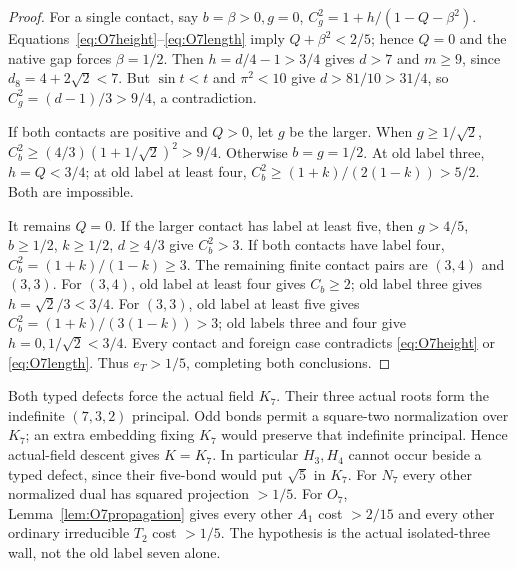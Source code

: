 \documentclass[11pt]{article}
\begin{document}
\begin{proof}
For a single contact, say $b=\beta>0,g=0$,
$C_g^2=1+h/(1-Q-\beta^2)$.
Equations~\eqref{eq:O7height}--\eqref{eq:O7length} imply
$Q+\beta^2<2/5$; hence $Q=0$ and the native gap forces $\beta=1/2$.
Then $h=d/4-1>3/4$ gives $d>7$ and $m\ge9$,
since $d_8=4+2\sqrt2<7$.
But $\sin t<t$ and $\pi^2<10$ give $d>81/10>31/4$,
so $C_g^2=(d-1)/3>9/4$, a contradiction.

If both contacts are positive and $Q>0$, let $g$ be the larger.
When $g\ge1/\sqrt2$,
$C_b^2\ge(4/3)(1+1/\sqrt2)^2>9/4$.
Otherwise $b=g=1/2$. At old label three, $h=Q<3/4$;
at old label at least four,
$C_b^2\ge(1+k)/(2(1-k))>5/2$.
Both are impossible.

It remains $Q=0$. If the larger contact has label at least five,
then $g>\!4/5$, $b\ge1/2$, $k\ge1/2$, $d\ge4/3$ give
$C_b^2>3$. If both contacts have label four,
$C_b^2=(1+k)/(1-k)\ge3$.
The remaining finite contact pairs are $(3,4)$ and $(3,3)$.
For $(3,4)$, old label at least four gives $C_b\ge2$;
old label three gives $h=\sqrt2/3<3/4$.
For $(3,3)$, old label at least five gives
$C_b^2=(1+k)/(3(1-k))>3$;
old labels three and four give $h=0,1/\sqrt2<3/4$.
Every contact and foreign case contradicts
\eqref{eq:O7height} or \eqref{eq:O7length}.
Thus $e_T>1/5$, completing both conclusions.
\end{proof}

Both typed defects force the actual field $K_7$. Their three actual
roots form the indefinite $(7,3,2)$ principal. Odd bonds permit a
square-two normalization over $K_7$; an extra embedding fixing $K_7$
would preserve that indefinite principal. Hence actual-field descent
gives $K=K_7$. In particular $H_3,H_4$ cannot occur beside a typed
defect, since their five-bond would put $\sqrt5$ in $K_7$.
For $N_7$ every other normalized dual has squared projection $>1/5$.
For $O_7$, Lemma~\ref{lem:O7propagation} gives every other $A_1$
cost $>2/15$ and every other ordinary irreducible $T_2$ cost $>1/5$.
The hypothesis is the actual isolated-three wall, not the old label
seven alone.
\end{document}
